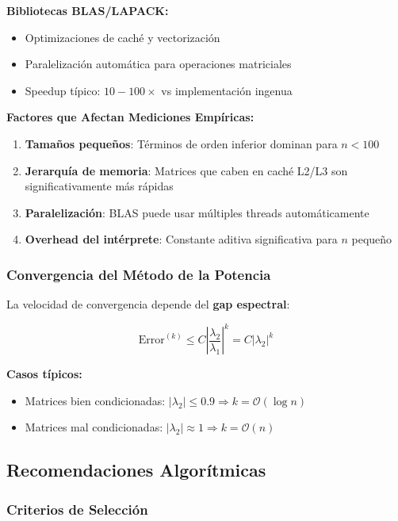 \textbf{Bibliotecas BLAS/LAPACK:}
\begin{itemize}
\item Optimizaciones de caché y vectorización
\item Paralelización automática para operaciones matriciales
\item Speedup típico: $10-100\times$ vs implementación ingenua
\end{itemize}

\textbf{Factores que Afectan Mediciones Empíricas:}
\begin{enumerate}
\item \textbf{Tamaños pequeños}: Términos de orden inferior dominan para $n < 100$
\item \textbf{Jerarquía de memoria}: Matrices que caben en caché L2/L3 son significativamente más rápidas
\item \textbf{Paralelización}: BLAS puede usar múltiples threads automáticamente
\item \textbf{Overhead del intérprete}: Constante aditiva significativa para $n$ pequeño
\end{enumerate}

\subsubsection{Convergencia del Método de la Potencia}

La velocidad de convergencia depende del \textbf{gap espectral}:

\begin{equation}
\text{Error}^{(k)} \leq C \left|\frac{\lambda_2}{\lambda_1}\right|^k = C |\lambda_2|^k
\end{equation}

\textbf{Casos típicos:}
\begin{itemize}
\item Matrices bien condicionadas: $|\lambda_2| \leq 0.9 \Rightarrow k = \mathcal{O}(\log n)$
\item Matrices mal condicionadas: $|\lambda_2| \approx 1 \Rightarrow k = \mathcal{O}(n)$
\end{itemize}

\subsection{Recomendaciones Algorítmicas}

\subsubsection{Criterios de Selección}

